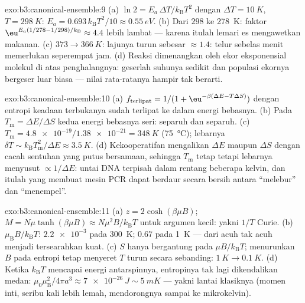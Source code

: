 \begin{solution}{exo:b3:canonical-ensemble:9}
(a) $\ln2 = E_a\,\Delta T/k_{\text{B}}T^2$ dengan $\Delta T =
\qty{10}{K}$, $T = \qty{298}{K}$: $E_a =
0.693\,k_{\text{B}}T^2/10 \approx \qty{0.55}{eV}$. (b) Dari
$298$ ke \qty{278}{K}: faktor $\eu^{E_a(1/278 - 1/298)/k_{\text{B}}}
\approx 4.4$ lebih lambat --- karena itulah lemari es mengawetkan
makanan. (c) $373 \to \qty{366}{K}$: lajunya turun sebesar
$\approx1.4$: telur sebelas menit memerlukan seperempat jam. (d) Reaksi
dimenangkan oleh ekor eksponensial molekul di atas penghalangnya:
geserlah suhunya sedikit dan populasi ekornya bergeser luar biasa ---
nilai rata-ratanya hampir tak berarti.
\end{solution}

\begin{solution}{exo:b3:canonical-ensemble:10}
(a) $f_{\text{terlipat}} = 1/(1 + \eu^{-\beta(\Delta E -
T\Delta S)})$ dengan entropi keadaan terbukanya sudah terlipat ke dalam
energi bebasnya. (b) Pada $T_{\text{m}} = \Delta E/\Delta S$ kedua
energi bebasnya seri: separuh dan separuh. (c) $T_{\text{m}} =
\num{4.8e-19}/\num{1.38e-21} = \qty{348}{K}$ (\qty{75}{\celsius});
lebarnya $\delta T \sim k_{\text{B}}T_{\text{m}}^2/\Delta E \approx
\qty{3.5}{K}$. (d) Kekooperatifan mengalikan $\Delta E$ maupun
$\Delta S$ dengan cacah sentuhan yang putus bersamaan, sehingga
$T_{\text{m}}$ tetap tetapi lebarnya menyusut $\propto 1/\Delta E$:
untai DNA terpisah dalam rentang beberapa kelvin, dan itulah yang
membuat mesin PCR dapat berdaur secara bersih antara ``melebur'' dan
``menempel''.
\end{solution}

\begin{solution}{exo:b3:canonical-ensemble:11}
(a) $z = 2\cosh(\beta\mu B)$; $M = N\mu\tanh(\beta\mu B) \approx
N\mu^2B/k_{\text{B}}T$ untuk argumen kecil: yakni $1/T$ Curie. (b)
$\mu_{\text{B}}B/k_{\text{B}}T$: $\num{2.2e-3}$ pada \qty{300}{K};
$0.67$ pada \qty{1}{K} --- dari acuh tak acuh menjadi tersearahkan
kuat. (c) $S$ hanya bergantung pada $\mu B/k_{\text{B}}T$; menurunkan
$B$ pada entropi tetap menyeret $T$ turun secara sebanding: $\qty{1}{K} \to
\qty{0.1}{K}$. (d) Ketika $k_{\text{B}}T$ mencapai energi antarspinnya,
entropinya tak lagi dikendalikan medan:
$\mu_0\mu_{\text{B}}^2/4\pi a^3 \approx \qty{7e-26}{J} \sim
\qty{5}{mK}$ --- yakni lantai klasiknya (momen inti, seribu kali lebih
lemah, mendorongnya sampai ke mikrokelvin).
\end{solution}

